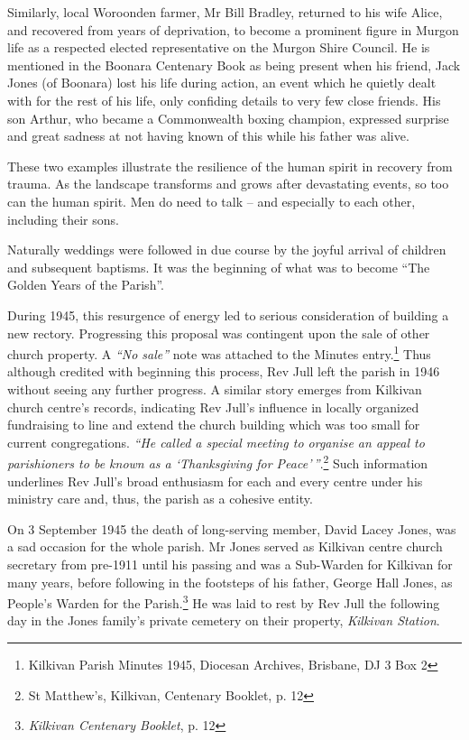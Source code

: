 Similarly, local Woroonden farmer, Mr Bill Bradley, returned to his wife Alice, and recovered from years of deprivation, to become a prominent figure in Murgon life as a respected elected representative on the Murgon Shire Council. He is mentioned in the Boonara Centenary Book as being present when his friend, Jack Jones (of Boonara) lost his life during action, an event which he quietly dealt with for the rest of his life, only confiding details to very few close friends. His son Arthur, who became a Commonwealth boxing champion, expressed surprise and great sadness at not having known of this while his father was alive.



These two examples illustrate the resilience of the human spirit in recovery from trauma. As the landscape transforms and grows after devastating events, so too can the human spirit. Men do need to talk -- and especially to each other, including their sons.



Naturally weddings were followed in due course by the joyful arrival of children and subsequent baptisms. It was the beginning of what was to become ``The Golden Years of the Parish''.



During 1945, this resurgence of energy led to serious consideration of building a new rectory. Progressing this proposal was contingent upon the sale of other church property. A \emph{``No sale''} note was attached to the Minutes entry.\footnote{Kilkivan Parish Minutes 1945, Diocesan Archives, Brisbane, DJ 3 Box 2} Thus although credited with beginning this process, Rev Jull left the parish in 1946 without seeing any further progress. A similar story emerges from Kilkivan church centre's records, indicating Rev Jull's influence in locally organized fundraising to line and extend the church building which was too small for current congregations. \emph{``He called a special meeting to organise an appeal to parishioners to be known as a `Thanksgiving for Peace'\,''}.\footnote{St Matthew's, Kilkivan, Centenary Booklet, p. 12} Such information underlines Rev Jull's broad enthusiasm for each and every centre under his ministry care and, thus, the parish as a cohesive entity.


On 3 September 1945 the death of long-serving member, David Lacey Jones, was a sad occasion for the whole parish. Mr Jones served as Kilkivan centre church secretary from pre-1911 until his passing and was a Sub-Warden for Kilkivan for many years, before following in the footsteps of his father, George Hall Jones, as People's Warden for the Parish.\footnote{\emph{Kilkivan Centenary Booklet}, p. 12} He was laid to rest by Rev Jull the following day in the Jones family's private cemetery on their property, \emph{Kilkivan Station}.


